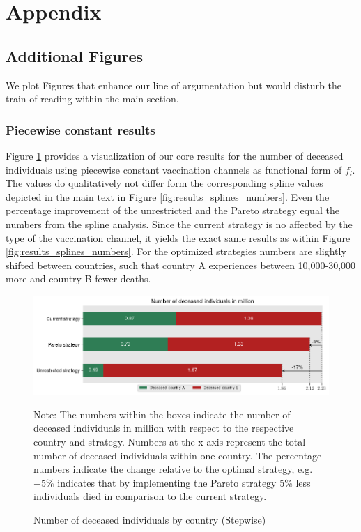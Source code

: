 \appendix
{}
\section{Appendix}

\subsection{Additional Figures}
We plot Figures that enhance our line of argumentation but would disturb the train of reading within the main section.
\subsubsection{Piecewise constant results}
\label{A:piecewise}
Figure \ref{fig:results_piecewise_numbers} provides a visualization of our core results for the number of deceased individuals using piecewise constant vaccination channels as functional form of $f_l$. The values do qualitatively not differ form the corresponding spline values depicted in the main text in Figure \ref{fig:results_splines_numbers}. Even the percentage improvement of the unrestricted and the Pareto strategy equal the numbers from the spline analysis. Since the current strategy is no affected by the type of the vaccination channel, it yields the exact same results as within Figure \ref{fig:results_splines_numbers}. For the optimized strategies numbers are slightly shifted between countries, such that country A experiences between 10,000-30,000 more and country B fewer deaths. 
\begin{figure}[h!]
\centering
\includegraphics[scale=0.65]{images/piecewise_percentage_deviation.png}\\
\begin{flushleft}
\scriptsize{Note: The numbers within the boxes indicate the number of deceased individuals in million with respect to the respective country and strategy. Numbers at the x-axis represent the total number of deceased individuals within one country. The percentage numbers indicate the change relative to the optimal strategy, e.g. $-5\%$ indicates that by implementing the Pareto strategy 5\% less individuals died in comparison to the current strategy.}
\end{flushleft}
\caption{Number of deceased individuals by country (Stepwise)}
\label{fig:results_piecewise_numbers}
\end{figure}

